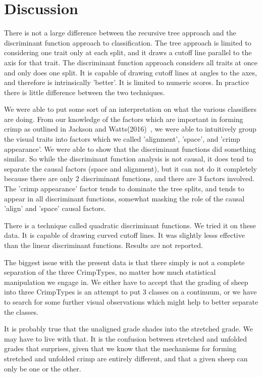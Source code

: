 \documentclass[titlepage]{article}  %
\begin{document}
\section{Discussion}
There is not a large difference between the recursive tree approach and the discriminant function approach to classification. The tree approach is limited to considering one trait only at each split, and it draws a cutoff line parallel to the axis for that trait. The discriminant function approach considers all traits at once and only does one split. It is capable of drawing cutoff lines at angles to the axes, and therefore is intrinsically 'better'. It is limited to numeric scores. In practice there is  little difference between the two techniques.

We were able to put some sort of an interpretation on what the various classifiers are doing. From our knowledge of the factors which are important in forming crimp as outlined in Jackson and Watts(2016)~\cite{jack:16}, we were able to intuitively group the visual traits into factors which we called 'alignment', 'space', and 'crimp appearance'. We were able to show that the discriminant functions did something similar. So while the discriminant function analysis is not causal, it does tend to separate the causal factors (space and alignment), but it can not do it completely because there are only 2 discriminant functions, and there are 3 factors involved. The 'crimp appearance' factor tends to  dominate the tree splits, and tends to appear in all discriminant functions, somewhat masking the role of the causal 'align' and 'space' causal factors.

There is a technique called quadratic discriminant functions. We tried it on these data. It  is capable of drawing curved cutoff lines. It was slightly lesss effective than the linear discriminant functions. Results are not reported.

The biggest issue with the present data is that there simply is not a complete separation of the three CrimpTypes, no matter how much statistical manipulation we engage in. We either have to accept that the grading of sheep into three CrimpTypes is an attempt to put 3 classes on a continuum, or we have to search for some further visual observations which might help to better separate the classes. 

It is probably true that the unaligned grade shades into the stretched grade. We may have to live with that. It is the confusion between stretched and unfolded grades that surprises, given that we know that the mechanisms for forming stretched and unfolded crimp are entirely different, and that a given sheep can only be one or the other.
\end{document}
